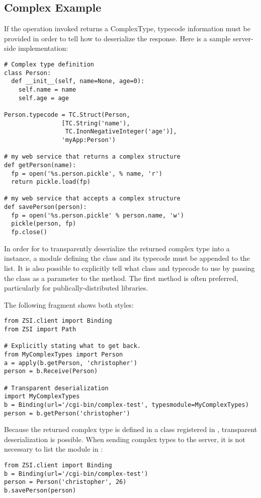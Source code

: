 \subsection{Complex Example}
If the operation invoked returns a ComplexType, typecode information must
be provided in order to tell \ZSI{} how to deserialize the response.
Here is a sample server-side implementation:

\begin{verbatim}
# Complex type definition
class Person:
  def __init__(self, name=None, age=0):
    self.name = name
    self.age = age

Person.typecode = TC.Struct(Person,
			    [TC.String('name'),
			     TC.InonNegativeInteger('age')],
			    'myApp:Person')

# my web service that returns a complex structure
def getPerson(name):
  fp = open('%s.person.pickle', % name, 'r')
  return pickle.load(fp)

# my web service that accepts a complex structure
def savePerson(person):
  fp = open('%s.person.pickle' % person.name, 'w')
  pickle(person, fp)
  fp.close()
\end{verbatim}

In order for \ZSI{} to transparently deserialize the returned complex type into
a  instance, a module defining the class and its typecode must
be appended to the  list.
It is also possible to explicitly tell \ZSI{} what class and typecode to
use by passing the class as a parameter to the
 method.
The first method is often preferred, particularly for publically-distributed
libraries.

The following fragment shows both styles:

\begin{verbatim}
from ZSI.client import Binding
from ZSI import Path

# Explicitly stating what to get back.
from MyComplexTypes import Person
a = apply(b.getPerson, 'christopher')
person = b.Receive(Person)

# Transparent deserialization
import MyComplexTypes
b = Binding(url='/cgi-bin/complex-test', typesmodule=MyComplexTypes)
person = b.getPerson('christopher')
\end{verbatim}

Because the returned complex type is defined in a class registered in 
, transparent deserialization is possible.  When sending
complex types to the server, it is not necessary to list the module
in :

\begin{verbatim}
from ZSI.client import Binding
b = Binding(url='/cgi-bin/complex-test')
person = Person('christopher', 26)
b.savePerson(person)
\end{verbatim}

